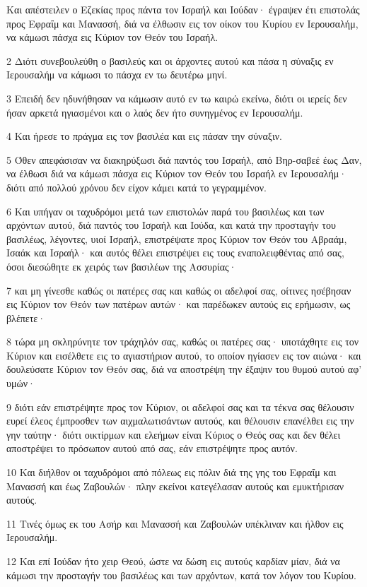 \par Και απέστειλεν ο Εζεκίας προς πάντα τον Ισραήλ και Ιούδαν· έγραψεν έτι επιστολάς προς Εφραΐμ και Μανασσή, διά να έλθωσιν εις τον οίκον του Κυρίου εν Ιερουσαλήμ, να κάμωσι πάσχα εις Κύριον τον Θεόν του Ισραήλ.
\par 2 Διότι συνεβουλεύθη ο βασιλεύς και οι άρχοντες αυτού και πάσα η σύναξις εν Ιερουσαλήμ να κάμωσι το πάσχα εν τω δευτέρω μηνί.
\par 3 Επειδή δεν ηδυνήθησαν να κάμωσιν αυτό εν τω καιρώ εκείνω, διότι οι ιερείς δεν ήσαν αρκετά ηγιασμένοι και ο λαός δεν ήτο συνηγμένος εν Ιερουσαλήμ.
\par 4 Και ήρεσε το πράγμα εις τον βασιλέα και εις πάσαν την σύναξιν.
\par 5 Όθεν απεφάσισαν να διακηρύξωσι διά παντός του Ισραήλ, από Βηρ-σαβεέ έως Δαν, να έλθωσι διά να κάμωσι πάσχα εις Κύριον τον Θεόν του Ισραήλ εν Ιερουσαλήμ· διότι από πολλού χρόνου δεν είχον κάμει κατά το γεγραμμένον.
\par 6 Και υπήγαν οι ταχυδρόμοι μετά των επιστολών παρά του βασιλέως και των αρχόντων αυτού, διά παντός του Ισραήλ και Ιούδα, και κατά την προσταγήν του βασιλέως, λέγοντες, υιοί Ισραήλ, επιστρέψατε προς Κύριον τον Θεόν του Αβραάμ, Ισαάκ και Ισραήλ· και αυτός θέλει επιστρέψει εις τους εναπολειφθέντας από σας, όσοι διεσώθητε εκ χειρός των βασιλέων της Ασσυρίας·
\par 7 και μη γίνεσθε καθώς οι πατέρες σας και καθώς οι αδελφοί σας, οίτινες ησέβησαν εις Κύριον τον Θεόν των πατέρων αυτών· και παρέδωκεν αυτούς εις ερήμωσιν, ως βλέπετε·
\par 8 τώρα μη σκληρύνητε τον τράχηλόν σας, καθώς οι πατέρες σας· υποτάχθητε εις τον Κύριον και εισέλθετε εις το αγιαστήριον αυτού, το οποίον ηγίασεν εις τον αιώνα· και δουλεύσατε Κύριον τον Θεόν σας, διά να αποστρέψη την έξαψιν του θυμού αυτού αφ' υμών·
\par 9 διότι εάν επιστρέψητε προς τον Κύριον, οι αδελφοί σας και τα τέκνα σας θέλουσιν ευρεί έλεος έμπροσθεν των αιχμαλωτισάντων αυτούς, και θέλουσιν επανέλθει εις την γην ταύτην· διότι οικτίρμων και ελεήμων είναι Κύριος ο Θεός σας και δεν θέλει αποστρέψει το πρόσωπον αυτού από σας, εάν επιστρέψητε προς αυτόν.
\par 10 Και διήλθον οι ταχυδρόμοι από πόλεως εις πόλιν διά της γης του Εφραΐμ και Μανασσή και έως Ζαβουλών· πλην εκείνοι κατεγέλασαν αυτούς και εμυκτήρισαν αυτούς.
\par 11 Τινές όμως εκ του Ασήρ και Μανασσή και Ζαβουλών υπέκλιναν και ήλθον εις Ιερουσαλήμ.
\par 12 Και επί Ιούδαν ήτο χειρ Θεού, ώστε να δώση εις αυτούς καρδίαν μίαν, διά να κάμωσι την προσταγήν του βασιλέως και των αρχόντων, κατά τον λόγον του Κυρίου.
